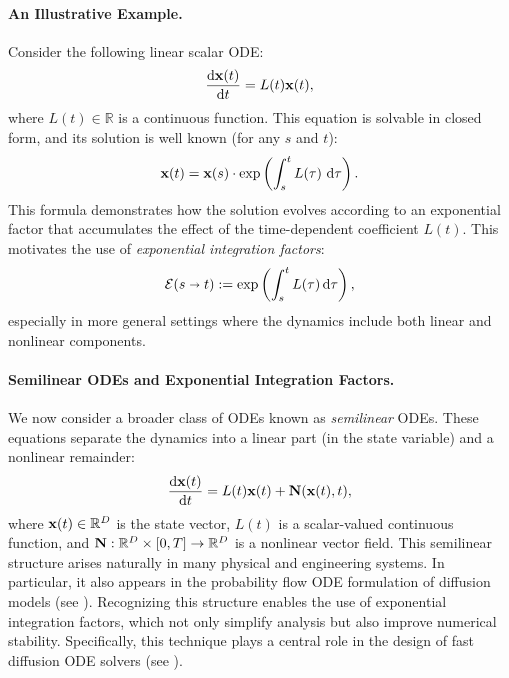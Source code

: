 \paragraph{An Illustrative Example.}
Consider the following linear scalar ODE:
\[
\frac{\mathop{}\!\mathrm{d} {\mathbf{x}}(t)}{\mathop{}\!\mathrm{d} t} = L(t){\mathbf{x}}(t),
\]
where $L(t) \in \mathbb{R}$ is a continuous function. This equation is solvable in closed form, and its solution is well known (for any $s$ and $t$):
\[
{\mathbf{x}}(t) = {\mathbf{x}}(s) \cdot \exp\left( \int_s^t L(\tau) \,\mathop{}\!\mathrm{d} \tau \right).
\]
This formula demonstrates how the solution evolves according to an exponential factor that accumulates the effect of the time-dependent coefficient $L(t)$. This motivates the use of \emph{exponential integration factors}:
\begin{align}\label{eq:exp-int-factor}
    \mathcal{E}(s \shortrightarrow t) := \exp\left( \int_s^t L(\tau)\mathop{}\!\mathrm{d} \tau \right),
\end{align}
especially in more general settings where the dynamics include both linear and nonlinear components.



\paragraph{Semilinear ODEs and Exponential Integration Factors.}
We now consider a broader class of ODEs known as \emph{semilinear} ODEs. These equations separate the dynamics into a linear part (in the state variable) and a nonlinear remainder:
\begin{align}\label{eq:semilinear-ode}
    \frac{\mathop{}\!\mathrm{d} {\mathbf{x}}(t)}{\mathop{}\!\mathrm{d} t} = L(t){\mathbf{x}}(t) + {\mathbf{N}}({\mathbf{x}}(t), t),
\end{align}
where ${\mathbf{x}}(t) \in \mathbb{R}^D$ is the state vector, $L(t)$ is a scalar-valued continuous function, and ${\mathbf{N}}: \mathbb{R}^D \times [0,T] \to \mathbb{R}^D$ is a nonlinear vector field. This semilinear structure arises naturally in many physical and engineering systems. In particular, it also appears in the probability flow ODE formulation of diffusion models (see ). Recognizing this structure enables the use of exponential integration factors, which not only simplify analysis but also improve numerical stability. Specifically, this technique plays a central role in the design of fast diffusion ODE solvers (see ).


